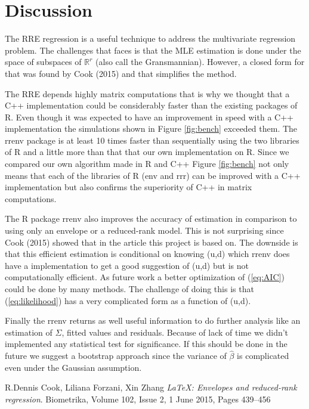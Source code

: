 \documentclass[11pt,a4paper]{article}
\begin{document}
\section{Discussion}

The RRE regression is a useful technique to address the multivariate regression problem.
The challenges that faces is that the MLE estimation is done under the space of subspaces of $\mathbb{R}^r$ (also call the Gransmannian).
However, a closed form for that was found by Cook (2015) and that simplifies the method.

The RRE depends highly matrix computations that is why we thought that a C++ implementation could be considerably faster than the existing packages of R. 
Even though it was expected to have an improvement in speed with a C++ implementation the simulations shown in Figure \ref{fig:bench} exceeded them.
The rrenv package is at least 10 times faster than sequentially using the two libraries of R and a little more than that that our own implementation on R.
Since we compared our own algorithm made in R and C++ Figure \ref{fig:bench} not only means that each of the libraries of R (env and rrr) can be improved with a C++ implementation but also confirms the superiority of C++ in matrix computations.

The R package rrenv also improves the accuracy of estimation in comparison to using only  an envelope or a reduced-rank model. 
This is not surprising since Cook (2015) showed that in the article this project is based on.
The downside is that this efficient estimation is conditional on knowing (u,d) which rrenv does have a implementation to get a good suggestion of (u,d) but is not computationally efficient.
As future work a better optimization of (\ref{eq:AIC}) could be done by many methods. 
The challenge of doing this is that (\ref{eq:likelihood}) has a very complicated form as a function of (u,d).

Finally the rrenv returns as well useful information to do further analysis like an estimation of $\Sigma$, fitted values and residuals.
Because of lack of time we didn't implemented any statistical test for significance.
If this should be done in the future we suggest a bootstrap approach since the variance of $\hat{\beta}$ is complicated even under the Gaussian assumption.


\begin{thebibliography}{999}

  R.Dennis Cook, Liliana Forzani, Xin Zhang
  \emph{\LaTeX: Envelopes and reduced-rank regression}.
  Biometrika,  Volume 102, Issue 2, 1 June 2015, Pages 439–456

\end{thebibliography}
\end{document}
